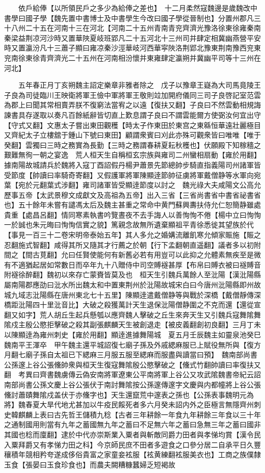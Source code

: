 　　依戶給俸【以所領民戶之多少為給俸之差也】　十二月柔然寇魏邊是歲魏改中書學曰國子學【魏先置中書博士及中書學生今改曰國子學從晉制也】分置州郡凡三十八州二十五在河南十三在河北【河南二十五州青南青兖齊濟光豫洛徐東徐雍秦南秦梁益荆凉河沙時又置華陜夏岐班郢凡二十五河北十三州司并肆定相冀幽燕營平安時又置瀛汾凡十三蕭子顯曰雍凉秦沙涇華岐河西華寜陜洛荆郢北豫東荆南豫西兖東兖南徐東徐青齊濟光二十五州在河南相汾懷并東雍肆定瀛朔并冀幽平司等十三州在河北】

　　五年春正月丁亥朔魏主詔定樂章非雅者除之　戊子以豫章王嶷為大司馬竟陵王子良為司徒臨川王映衛將軍王儉中軍將軍王敬則竝加開府儀同三司子良啓記室范雲為郡上曰聞其常相賣弄朕不復窮法當宥之以遠【復扶又翻】子良曰不然雲動相規誨諫書具存遂取以奏凡百餘紙辭皆切直上歎息謂子良曰不謂雲能爾方使弼汝何宜出守【守式又翻】文惠太子嘗出東田觀穫【時太子作東田於東宫之東緜恒華遠壯麗極目又齊紀太子立樓舘于鍾山下號曰東田】顧謂衆賓曰刈此亦殊可觀衆皆曰唯唯【唯于癸翻】雲獨曰三時之務實為長勤【三時之務謂春耕夏耘秋穫也】伏願殿下知稼穡之艱難無徇一朝之宴逸　荒人桓天生自稱桓玄宗族與雍司二州蠻相扇動【雍於用翻】據南陽故城請兵於魏將入寇丁酉詔假丹楊尹蕭景先節總帥步騎直指義陽司州諸軍皆受節度【帥讀曰率騎奇寄翻】又假護軍將軍陳顯逹節帥征虜將軍戴僧静等水軍向宛葉【宛於元翻葉式涉翻】雍司諸軍皆受顯逹節度以討之　魏光祿大夫咸陽文公高允歷事五帝【太武景穆文成獻文及高祖為五帝】出入三省【三省尚書省中書省祕書省也】五十餘年未嘗有譴馮太后及魏主甚重之常命中黄門蘇興夀扶侍允仁恕簡静雖處貴重【處昌呂翻】情同寒素執書吟覽晝夜不去手誨人以善恂恂不倦【楊中立曰恂恂一於誠也朱元晦曰恂恂信實之貌】篤親念故無所遺棄顯祖平青徐悉徙其望族於代【事見一百三十二卷宋明帝泰始五年】其人多允之婚媾流離飢寒允傾家賑施【賑之忍翻施式智翻】咸得其所又隨其才行薦之於朝【行下孟翻朝直遥翻】議者多以初附間之【間古莧翻】允曰任賢使能何有新舊必若有用豈可以此抑之允體素無疾至是微有不適猶起居如常數日而卒年九十八贈侍中司空賻襚甚厚【布帛曰賻衣被曰襚賻音附襚徐醉翻】魏初以來存亡蒙賚皆莫及也　桓天生引魏兵萬餘人至沘陽【漢沘陽縣屬南陽郡應劭曰沘水所出魏太和中置東荆州於沘陽故城宋白曰今唐州沘陽縣即州故城九域志沘陽縣在唐州東北七十五里】陳顯逹遣戴僧静等與戰於深橋【戴僧靜傳深橋距沘陽四十里沘音比】大破之殺獲萬計天生退保沘陽僧静圍之不克而還【還從宣翻又如字】荒人胡丘生起兵懸瓠以應齊魏人擊破之丘生來奔天生又引魏兵寇舞隂舞隂戍主殷公愍拒擊破之殺其副張麒麟天生被創退走【被皮義翻創初良翻】三月丁未以陳顯逹為雍州刺史【雍於用翻】顯逹進據舞陽城　夏五月壬辰魏主如靈泉池癸巳魏南平王渾卒　甲午魏主還平城詔復七廟子孫及外戚緦麻服已上賦役無所與【復方月翻七廟子孫自太祖已下緦麻三月服五服至緦麻而服盡與讀當曰預】　魏南部尚書公孫邃上谷公張儵帥衆與桓天生復寇舞隂殷公愍擊破之【儵式竹翻帥讀曰率復扶又翻　考異曰齊書魏虜傳云偽安南將軍遼東公平南將軍上谷公又攻武隂魏書帝紀云詔南部尚書公孫文慶上谷公張伏于南討舞隂按公孫邃傳邃字文慶與内都幢將上谷公張儵討蕭賾舞隂戍盖伏于亦儵字也】天生還竄荒中邃表之孫也【公孫表事魏明元為將】魏春夏大旱代地尤甚加以牛疫民餒死者多六月癸未詔内外之臣極言無隱齊州刺史韓麒麟上表曰古先哲王儲積九稔【古者三年耕餘一年食九年耕餘三年食以三十年之通制國用則當有九年之蓄國無九年之蓄曰不足無六年之蓄曰急無三年之蓄曰國非其國也稔而廩翻】逮於中代亦崇斯業入粟者與斬敵同爵力田者與孝悌均賞【漢令民入粟拜爵又有孝悌力田之科】今京師民庶不田者多遊食之口參分居二自承平日久豐穰積年競相矜夸遂成侈俗貴富之家童妾袨服【袨黄練翻袨服美衣也】工商之族僕隸玉食【張晏曰玉食珍食也】而農夫闕糟糠蠶婦乏短褐故